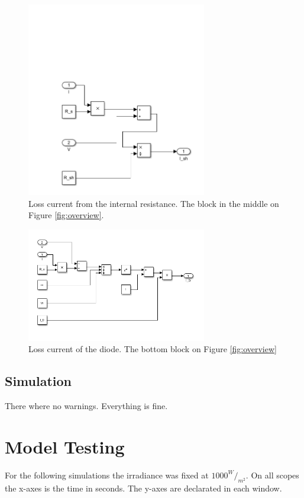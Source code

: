 		\begin{figure}[H]
			\centering
			\includegraphics[width=0.7\textwidth]{figures/i_sh.png}
			\caption[Loss current from the internal resistance.]{Loss current from the internal resistance. The block in the middle on Figure \ref{fig:overview}.}
			\label{fig:i_sh}
		\end{figure}
	
		\begin{figure}[H]
			\centering
			\includegraphics[width=0.7\textwidth]{figures/i_d.png}
			\caption[Loss current of the diode.]{Loss current of the diode. The bottom block on Figure \ref{fig:overview}}
			\label{fig:i_d}
		\end{figure}
	
	\subsection{Simulation}
	There where no warnings. Everything is fine.

\newpage
\section{Model Testing}
For the following simulations the irradiance was fixed at $1000^W/_{m^2}$.
On all scopes the x-axes is the time in seconds. The y-axes are declarated in each window.

